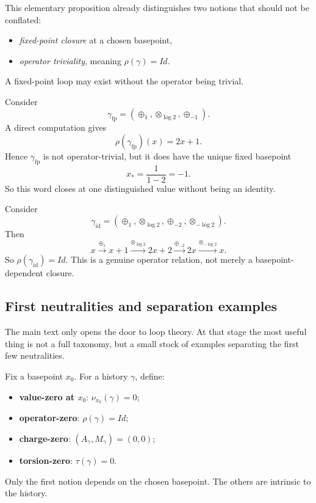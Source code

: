 This elementary proposition already distinguishes two notions that should not be conflated:
\begin{itemize}
    \item \emph{fixed-point closure} at a chosen basepoint,
    \item \emph{operator triviality}, meaning $\rho(\gamma)=Id$.
\end{itemize}
A fixed-point loop may exist without the operator being trivial.

\begin{example}
\label{ex:appE-fixed-not-identity}
Consider
\[
\gamma_{\mathrm{fp}}=(\oplus_1,\otimes_{\log 2},\oplus_{-1}).
\]
A direct computation gives
\[
\rho(\gamma_{\mathrm{fp}})(x)=2x+1.
\]
Hence $\gamma_{\mathrm{fp}}$ is not operator-trivial, but it does have the unique fixed basepoint
\[
x_\ast=\frac{1}{1-2}=-1.
\]
So this word closes at one distinguished value without being an identity.
\end{example}

\begin{example}
\label{ex:appE-identity-word}
Consider
\[
\gamma_{\mathrm{id}}=(\oplus_1,\otimes_{\log 2},\oplus_{-2},\otimes_{-\log 2}).
\]
Then
\[
x\xrightarrow{\oplus_1}x+1
\xrightarrow{\otimes_{\log 2}}2x+2
\xrightarrow{\oplus_{-2}}2x
\xrightarrow{\otimes_{-\log 2}}x.
\]
So $\rho(\gamma_{\mathrm{id}})=Id$.
This is a genuine operator relation, not merely a basepoint-dependent closure.
\end{example}

\subsection{First neutralities and separation examples}
\label{appE:first-neutralities}

The main text only opens the door to loop theory. At that stage the most useful thing is not a full taxonomy, but a small stock of examples separating the first few neutralities.

Fix a basepoint $x_0$.
For a history $\gamma$, define:
\begin{itemize}
    \item \textbf{value-zero at $x_0$}: $\nu_{x_0}(\gamma)=0$;
    \item \textbf{operator-zero}: $\rho(\gamma)=Id$;
    \item \textbf{charge-zero}: $(A_\gamma,M_\gamma)=(0,0)$;
    \item \textbf{torsion-zero}: $\tau(\gamma)=0$.
\end{itemize}
Only the first notion depends on the chosen basepoint. The others are intrinsic to the history.

